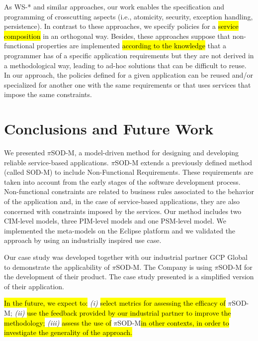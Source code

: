 \documentclass{singlecol-new}
\theoremstyle{TH}{
\newtheorem{lemma}{Lemma}
\newtheorem{theorem}[lemma]{Theorem}
\newtheorem{corrolary}[lemma]{Corrolary}
\newtheorem{conjecture}[lemma]{Conjecture}
\newtheorem{proposition}[lemma]{Proposition}
\newtheorem{claim}[lemma]{Claim}
\newtheorem{stheorem}[lemma]{Wrong Theorem}
\newtheorem{algorithm}{Algorithm}
}
\theoremstyle{THrm}{
\newtheorem{definition}{Definition}[section]
\newtheorem{question}{Question}[section]
\newtheorem{remark}{Remark}
\newtheorem{scheme}{Scheme}
}
\theoremstyle{THhit}{
\newtheorem{case}{Case}[section]
}
\theoremstyle{THhsl}{
\newtheorem{example}{Example}
}
\newcommand{\pisodm}[0]{$\pi$SOD-M\xspace}
\begin{document}
As WS-* and similar approaches, our work enables the specification and programming of crosscutting aspects (i.e., atomicity, security, exception handling, persistence).
In contrast to these approaches, we specify policies for a \hl{service composition} in an orthogonal way. Besides, these approaches suppose that non-functional properties are implemented \hl{according to the knowledge} that a programmer has of a specific application requirements but they are not derived in a methodological way, leading to ad-hoc solutions that can be difficult to reuse. In our approach,  the policies defined for a given application  can be reused and/or specialized for another one with the same requirements or that uses services that impose the same constraints. 


\section{Conclusions and Future Work}\label{sec:conclusions}
We presented \pisodm, a model-driven method for designing and developing reliable service-based applications.
\pisodm extends a previously defined method (called SOD-M) to include Non-Functional Requirements.
These requirements are taken into account from the early stages of the software development process.
Non-functional constraints are related to business rules associated to the behavior of the application and, in the case of service-based applications, they are also concerned with constraints imposed by the services.
Our method includes two CIM-level models, three PIM-level models and one PSM-level model.
We implemented the meta-models on the Eclipse platform and we validated the approach by using an industrially inspired use case.

Our case study was developed together with our industrial partner GCP Global to demonstrate the applicability of \pisodm.
The Company is using \pisodm for the development of their product.
The case study presented is a simplified version of their application. 

\hl{In the future, we expect to:}
\textit{(i)} \hl{select metrics for assessing the efficacy of} \pisodm;
%
\textit{(ii)} \hl{use the feedback provided by our industrial partner to improve the methodology;}
%
\textit{(iii)} \hl{assess the use of} \pisodm \hl{in other contexts, in order to investigate the generality of the approach. }



\end{document}

